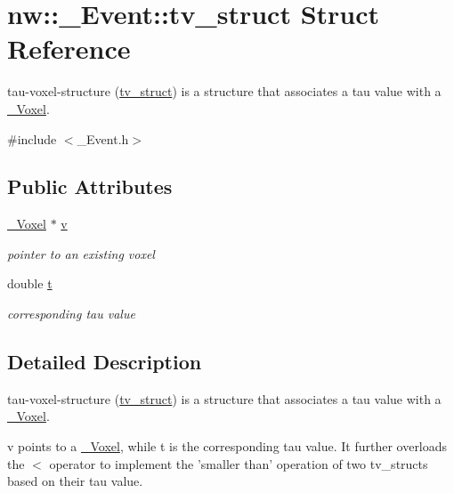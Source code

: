 \hypertarget{structnw_1_1___event_1_1tv__struct}{\section{nw\+:\+:\+\_\+\+Event\+:\+:tv\+\_\+struct Struct Reference}
\label{structnw_1_1___event_1_1tv__struct}
}


tau-\/voxel-\/structure (\hyperlink{structnw_1_1___event_1_1tv__struct}{tv\+\_\+struct}) is a structure that associates a tau value with a \hyperlink{classnw_1_1___voxel}{\+\_\+\+Voxel}.  




{\ttfamily \#include $<$\+\_\+\+Event.\+h$>$}

\subsection*{Public Attributes}
\begin{DoxyCompactItemize}
\item 
\hyperlink{classnw_1_1___voxel}{\+\_\+\+Voxel} $\ast$ \hyperlink{structnw_1_1___event_1_1tv__struct_af3cef61890dbf9b568baad7c2532ed56}{v}
\begin{DoxyCompactList}\small\item\em pointer to an existing voxel \end{DoxyCompactList}\item 
double \hyperlink{structnw_1_1___event_1_1tv__struct_a60486108e732f06bdb4bc5775e875c37}{t}
\begin{DoxyCompactList}\small\item\em corresponding tau value \end{DoxyCompactList}\end{DoxyCompactItemize}


\subsection{Detailed Description}
tau-\/voxel-\/structure (\hyperlink{structnw_1_1___event_1_1tv__struct}{tv\+\_\+struct}) is a structure that associates a tau value with a \hyperlink{classnw_1_1___voxel}{\+\_\+\+Voxel}. 

{\ttfamily v} points to a \hyperlink{classnw_1_1___voxel}{\+\_\+\+Voxel}, while {\ttfamily t} is the corresponding tau value. It further overloads the {\ttfamily $<$} operator to implement the 'smaller than' operation of two tv\+\_\+structs based on their tau value. 

